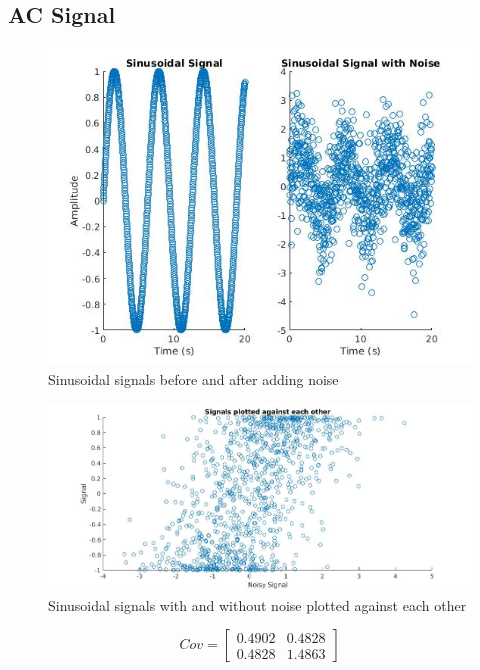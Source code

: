 \documentclass[a4paper, 12pt]{article}
\begin{document}
        \subsection{AC Signal}
            \begin{figure}[!t]
                \centering
                \includegraphics[width=\textwidth]{sine.jpg}
                \caption{Sinusoidal signals before and after adding noise}
                \label{fig:sin}
            \end{figure}
            \begin{figure}[!t]
                \centering
                \includegraphics[width=\textwidth]{signals.jpg}
                \caption{Sinusoidal signals with and without noise plotted against each other}
                \label{fig:sigs}
            \end{figure}

            \[Cov = 
            \begin{bmatrix}
                0.4902  &  0.4828 \\
                0.4828  &  1.4863
                \label{mat:cov}
            \end{bmatrix}\]
            
\end{document}
